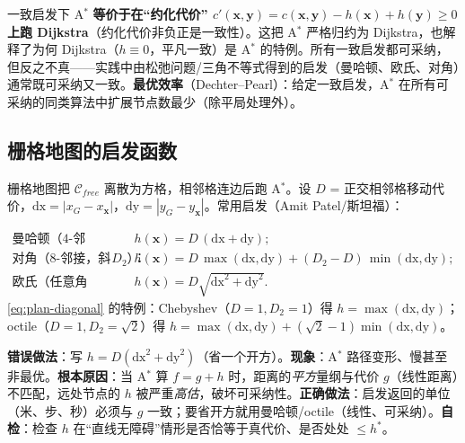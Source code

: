 \begin{insight}
一致启发下 A$^*$ \textbf{等价于在“约化代价” $c'(\mathbf{x},\mathbf{y})=c(\mathbf{x},\mathbf{y})-h(\mathbf{x})+h(\mathbf{y})\ge0$ 上跑 Dijkstra}（约化代价非负正是一致性）。这把 A$^*$ 严格归约为 Dijkstra，也解释了为何 Dijkstra（$h\equiv0$，平凡一致）是 A$^*$ 的特例。所有一致启发都可采纳，但反之不真——实践中由松弛问题/三角不等式得到的启发（曼哈顿、欧氏、对角）通常既可采纳又一致。\textbf{最优效率}（Dechter--Pearl）：给定一致启发，A$^*$ 在所有可采纳的同类算法中扩展节点数最少（除平局处理外）。
\end{insight}

\subsection{栅格地图的启发函数}
\label{sec:plan-grid}

栅格地图把 $\mathcal{C}_{free}$ 离散为方格，相邻格连边后跑 A$^*$。设 $D$ = 正交相邻格移动代价，$\mathrm{dx}=|x_G-x_{\mathbf{x}}|$，$\mathrm{dy}=|y_G-y_{\mathbf{x}}|$。常用启发（Amit Patel/斯坦福\cite{patel2018heuristics}）：

\begin{align}
  \text{曼哈顿（4-邻接）：}&\quad h(\mathbf{x})=D\,(\mathrm{dx}+\mathrm{dy}); \label{eq:plan-manhattan}\\
  \text{对角（8-邻接，斜走代价 }D_2\text{）：}&\quad h(\mathbf{x})=D\,\max(\mathrm{dx},\mathrm{dy})+(D_2-D)\,\min(\mathrm{dx},\mathrm{dy}); \label{eq:plan-diagonal}\\
  \text{欧氏（任意角度）：}&\quad h(\mathbf{x})=D\sqrt{\mathrm{dx}^2+\mathrm{dy}^2}. \label{eq:plan-euclid}
\end{align}
\cref{eq:plan-diagonal} 的特例：Chebyshev（$D=1,D_2=1$）得 $h=\max(\mathrm{dx},\mathrm{dy})$；octile（$D=1,D_2=\sqrt2$）得 $h=\max(\mathrm{dx},\mathrm{dy})+(\sqrt2-1)\min(\mathrm{dx},\mathrm{dy})$。

\begin{pitfall}
\textbf{错误做法}：写 $h=D(\mathrm{dx}^2+\mathrm{dy}^2)$（省一个开方）。\textbf{现象}：A$^*$ 路径变形、慢甚至非最优。\textbf{根本原因}：当 A$^*$ 算 $f=g+h$ 时，距离的\emph{平方}量纲与代价 $g$（线性距离）不匹配，远处节点的 $h$ 被严重\emph{高估}，破坏可采纳性。\textbf{正确做法}：启发返回的单位（米、步、秒）必须与 $g$ 一致；要省开方就用曼哈顿/octile（线性、可采纳）。\textbf{自检}：检查 $h$ 在“直线无障碍”情形是否恰等于真代价、是否处处 $\le h^*$。
\end{pitfall}

